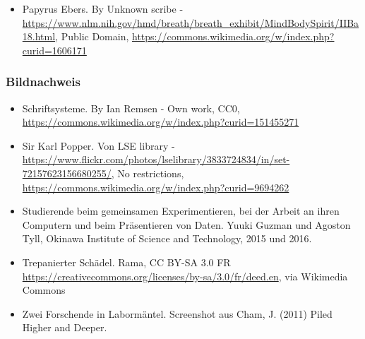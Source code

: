 \documentclass{beamer}
\begin{document}
\begin{frame}
\begin{tiny}
\begin{itemize}
\item 
Papyrus Ebers. By Unknown scribe - \url{https://www.nlm.nih.gov/hmd/breath/breath_exhibit/MindBodySpirit/IIBa18.html}, Public Domain, \url{https://commons.wikimedia.org/w/index.php?curid=1606171}


\end{itemize}

\end{tiny}
\end{frame}

\begin{frame}
\frametitle{Bildnachweis}

\vfill

\begin{tiny}
\begin{itemize}


  

\item 
Schriftsysteme. By Ian Remsen - Own work, CC0, \url{https://commons.wikimedia.org/w/index.php?curid=151455271}

\item 
Sir Karl Popper. Von LSE library - \url{https://www.flickr.com/photos/lselibrary/3833724834/in/set-72157623156680255/}, No restrictions, \url{https://commons.wikimedia.org/w/index.php?curid=9694262}

  
\item 
Studierende beim gemeinsamen Experimentieren, bei der Arbeit an ihren Computern und beim Präsentieren von Daten. Yuuki Guzman und Agoston Tyll, Okinawa Institute of Science and Technology, 2015 und 2016. 

\item 
Trepanierter Schädel. Rama, CC BY-SA 3.0 FR \url{https://creativecommons.org/licenses/by-sa/3.0/fr/deed.en}, via Wikimedia Commons

\item 
Zwei Forschende in Labormäntel. Screenshot aus Cham, J. (2011) Piled Higher and Deeper. 

\end{itemize}

\end{tiny}
\end{frame}
\end{document}
